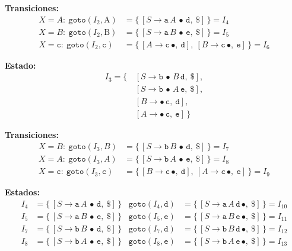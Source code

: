 \documentclass[12pt,letterpaper]{article}
\newcommand{\nt}[1]{\textit{#1}}
\newcommand{\tk}[1]{\texttt{#1}}
\newcommand{\tx}[1]{\text{#1}}
\begin{document}
\begin{enumerate}[label=\arabic*.]
  \textbf{Transiciones:}
  \[
  \begin{aligned}
    X=\nt{A}:\ \texttt{goto}(I_2,\tx{A}) &= \{\,[\nt{S}\to\tk{a}\,\nt{A}\,\bullet\,\tk{d},\ \tk{\$}]\,\} = \boxed{I_4}\\[3pt]
    X=\nt{B}:\ \texttt{goto}(I_2,\tx{B}) &= \{\,[\nt{S}\to\tk{a}\,\nt{B}\,\bullet\,\tk{e},\ \tk{\$}]\,\} = \boxed{I_5}\\[3pt]
    X=\tk{c}:\ \texttt{goto}(I_2,\tk{c}) &= \{\,[\nt{A}\to\tk{c}\,\bullet,\ \tk{d}],\ [\nt{B}\to\tk{c}\,\bullet,\ \tk{e}]\,\} = \boxed{I_6}
  \end{aligned}
  \]

  \medskip

  \textbf{Estado:}
  \[
  \begin{aligned}
  I_3 = \{\, & [\nt{S}\to\tk{b}\,\bullet\,\nt{B}\,\tk{d},\ \tk{\$}],\\
             & [\nt{S}\to\tk{b}\,\bullet\,\nt{A}\,\tk{e},\ \tk{\$}],\\
             & [\nt{B}\to\bullet\,\tk{c},\ \tk{d}],\\
             & [\nt{A}\to\bullet\,\tk{c},\ \tk{e}]\,\}
  \end{aligned}
  \]
  
  \textbf{Transiciones:}
  \[
  \begin{aligned}
    X=\nt{B}:\ \texttt{goto}(I_3,\nt{B}) &= \{\,[\nt{S}\to\tk{b}\,\nt{B}\,\bullet\,\tk{d},\ \tk{\$}]\,\} = \boxed{I_7}\\[3pt]
    X=\nt{A}:\ \texttt{goto}(I_3,\nt{A}) &= \{\,[\nt{S}\to\tk{b}\,\nt{A}\,\bullet\,\tk{e},\ \tk{\$}]\,\} = \boxed{I_8}\\[3pt]
    X=\tk{c}:\ \texttt{goto}(I_3,\tk{c}) &= \{\,[\nt{B}\to\tk{c}\,\bullet,\ \tk{d}],\ [\nt{A}\to\tk{c}\,\bullet,\ \tk{e}]\,\} = \boxed{I_9}
  \end{aligned}
  \]

  \medskip

  \textbf{Estados:}
  \[
  \begin{aligned}
    I_4 &= \{\,[\nt{S}\to\tk{a}\,\nt{A}\,\bullet\,\tk{d},\ \tk{\$}]\,\} &
      \texttt{goto}(I_4,\tk{d}) &= \{\,[\nt{S}\to\tk{a}\,\nt{A}\,\tk{d}\,\bullet,\ \tk{\$}]\,\} = \boxed{I_{10}}\\[3pt]
    I_5 &= \{\,[\nt{S}\to\tk{a}\,\nt{B}\,\bullet\,\tk{e},\ \tk{\$}]\,\} &
      \texttt{goto}(I_5,\tk{e}) &= \{\,[\nt{S}\to\tk{a}\,\nt{B}\,\tk{e}\,\bullet,\ \tk{\$}]\,\} = \boxed{I_{11}}\\[3pt]
    I_7 &= \{\,[\nt{S}\to\tk{b}\,\nt{B}\,\bullet\,\tk{d},\ \tk{\$}]\,\} &
      \texttt{goto}(I_7,\tk{d}) &= \{\,[\nt{S}\to\tk{b}\,\nt{B}\,\tk{d}\,\bullet,\ \tk{\$}]\,\} = \boxed{I_{12}}\\[3pt]
    I_8 &= \{\,[\nt{S}\to\tk{b}\,\nt{A}\,\bullet\,\tk{e},\ \tk{\$}]\,\} &
      \texttt{goto}(I_8,\tk{e}) &= \{\,[\nt{S}\to\tk{b}\,\nt{A}\,\tk{e}\,\bullet,\ \tk{\$}]\,\} = \boxed{I_{13}}
  \end{aligned}
  \]


\end{enumerate}
\end{document}
